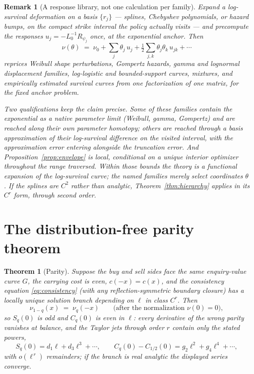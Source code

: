 \documentclass[11pt]{article}
\newtheorem{theorem}{Theorem}
\newtheorem{remark}{Remark}
\begin{document}
\begin{remark}[A response library, not one calculation per family]
Expand a log-survival deformation on a basis $\{r_j\}$ --- splines, Chebyshev polynomials, or hazard bumps, on the compact strike interval the policy actually visits --- and precompute the responses $u_j = -L_0^{-1}R_{\psi_j}$ once, at the exponential anchor. Then
\[
\nu(\theta) \;=\; \nu_0 + \sum_j \theta_j\, u_j + \tfrac12\sum_{j,k}\theta_j\theta_k\, u_{jk} + \cdots
\]
reprices Weibull shape perturbations, Gompertz hazards, gamma and lognormal displacement families, log-logistic and bounded-support curves, mixtures, and empirically estimated survival curves \citep{fgp2017} from one factorization of one matrix, for the fixed anchor problem.

Two qualifications keep the claim precise. Some of these families contain the exponential as a native parameter limit (Weibull, gamma, Gompertz) and are reached along their own parameter homotopy; others are reached through a basis approximation of their log-survival difference on the visited interval, with the approximation error entering alongside the truncation error. And Proposition~\ref{prop:envelope} is local, conditional on a unique interior optimizer throughout the range traversed. Within those bounds the theory is a functional expansion of the log-survival curve; the named families merely select coordinates $\theta$. If the splines are $C^2$ rather than analytic, Theorem~\ref{thm:hierarchy} applies in its $C^r$ form, through second order.
\end{remark}

\section{The distribution-free parity theorem}\label{sec:parity}

\begin{theorem}[Parity]\label{thm:parity}
Suppose the buy and sell sides face the same enquiry-value curve $G$, the carrying cost is even, $c(-x) = c(x)$, and the consistency equation \eqref{eq:consistency} (with any reflection-symmetric boundary closure) has a locally unique solution branch depending on $\ell$ in class $C^r$. Then
\[
\nu_{1-q}(x) \;=\; \nu_q(-x) \qquad\text{(after the normalization $\nu(0)=0$)},
\]
so $S_q(0)$ is odd and $C_q(0)$ is even in $\ell$: every derivative of the wrong parity vanishes at balance, and the Taylor jets through order $r$ contain only the stated powers,
\[
S_q(0) = d_1 \ell + d_3 \ell^3 + \cdots, \qquad
C_q(0) - C_{1/2}(0) = g_2 \ell^2 + g_4 \ell^4 + \cdots ,
\]
with $o(\ell^{\,r})$ remainders; if the branch is real analytic the displayed series converge.
\end{theorem}
\end{document}
